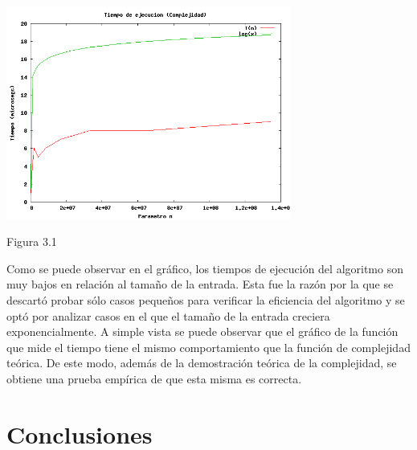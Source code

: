 \documentclass[a4paper,10pt] {article}
\begin{document}
\begin{center}
 \includegraphics[width=0.7\textwidth]{Plots/Ej3-Complejidad.png}
\begin{center}
Figura 3.1
\end{center}
\end{center}

Como se puede observar en el gr\'afico, los tiempos de ejecuci\'on del algoritmo son muy bajos en relaci\'on al tama\~{n}o de la entrada. Esta fue la raz\'on por la que se descart\'o probar s\'olo casos peque\~{n}os para verificar la eficiencia del algoritmo y se opt\'o por analizar casos en el que el tama\~{n}o de la entrada creciera exponencialmente. A simple vista se puede observar que el gr\'afico de la funci\'on que mide el tiempo tiene el mismo comportamiento que la funci\'on de complejidad te\'orica. De este modo, adem\'as de la demostraci\'on te\'orica de la complejidad, se obtiene una prueba emp\'irica de que esta misma es correcta.

\section*{Conclusiones}
\end{document}

